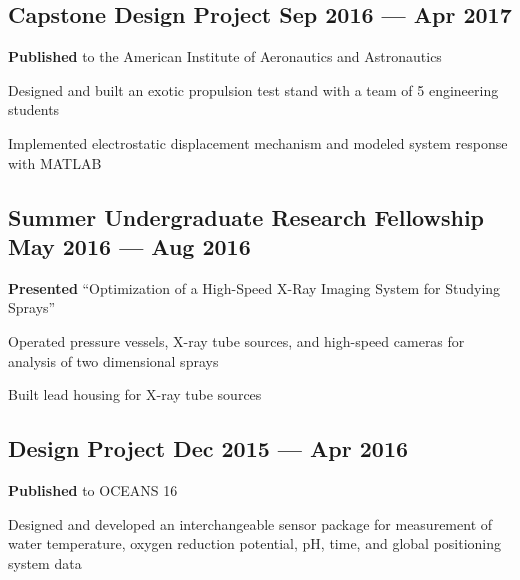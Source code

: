 \subsection{{Capstone Design Project \hfill Sep 2016 --- Apr 2017}}
\begin{zitemize}
\item \textbf{Published} to the American Institute of Aeronautics and Astronautics
\item Designed and built an exotic propulsion test stand with a team of 5 engineering students
\item Implemented electrostatic displacement mechanism and modeled system response with MATLAB
\end{zitemize}

\subsection{{Summer Undergraduate Research Fellowship \hfill May 2016 --- Aug 2016}}
\begin{zitemize}
\item \textbf{Presented} ``Optimization of a High-Speed X-Ray Imaging System for Studying Sprays''
\item Operated pressure vessels, X-ray tube sources, and high-speed cameras for analysis of two dimensional sprays
\item Built lead housing for X-ray tube sources
\end{zitemize}

\newpage

\subsection{{Design Project \hfill Dec 2015 --- Apr 2016}}
\begin{zitemize}
\item \textbf{Published} to OCEANS 16
\item Designed and developed an interchangeable sensor package for measurement of water temperature, oxygen reduction potential, pH, time, and global positioning system data
\end{zitemize}